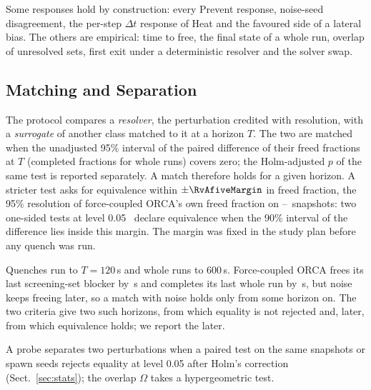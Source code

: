 Some responses hold by construction: every Prevent response, noise-seed disagreement, the per-step $\Delta t$ response of Heat and the favoured side of a lateral bias. The others are empirical: time to free, the final state of a whole run, overlap of unresolved sets, first exit under a deterministic resolver and the solver swap.

\subsection{Matching and Separation}\label{sec:protocol}
The protocol compares a \emph{resolver}, the perturbation credited with resolution, with a \emph{surrogate} of another class matched to it at a horizon $T$. The two are matched when the unadjusted 95\% interval of the paired difference of their freed fractions at $T$ (completed fractions for whole runs) covers zero; the Holm-adjusted $p$ of the same test is reported separately. A match therefore holds for a given horizon. A stricter test asks for equivalence within $\pm\RvAfiveMargin$ in freed fraction, the 95\% resolution of force-coupled ORCA's own freed fraction on \EtwoNLK--\PairN\ snapshots: two one-sided tests at level 0.05~\cite{schuirmann1987} declare equivalence when the 90\% interval of the difference lies inside this margin. The margin was fixed in the study plan before any quench was run.

Quenches run to $T=120$\,s and whole runs to 600\,s. Force-coupled ORCA frees its last screening-set blocker by \RevAeightSTRvoLatest\,s and completes its last whole run by \RevAeightWholeRvoLatest\,s, but noise keeps freeing later, so a match with noise holds only from some horizon on. The two criteria give two such horizons, from which equality is not rejected and, later, from which equivalence holds; we report the later.

A probe separates two perturbations when a paired test on the same snapshots or spawn seeds rejects equality at level 0.05 after Holm's correction (Sect.~\ref{sec:stats}); the overlap $\Omega$ takes a hypergeometric test.
